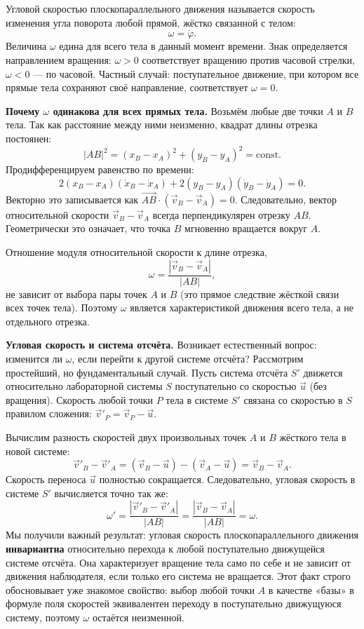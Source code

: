 \documentclass[../main.tex]{subfiles}
\begin{document}
\begin{definition}
Угловой скоростью плоскопараллельного движения называется скорость изменения
угла поворота любой прямой, жёстко связанной с телом:
\[
\omega = \dot\varphi.
\]
Величина $\omega$ едина для всего тела в данный момент времени.
Знак определяется направлением вращения: $\omega > 0$ соответствует
вращению против часовой стрелки, $\omega < 0$ --- по часовой.
Частный случай: поступательное движение, при котором все прямые тела
сохраняют своё направление, соответствует $\omega = 0$.
\end{definition}

\noindent\textbf{Почему $\omega$ одинакова для всех прямых тела.}
Возьмём любые две точки $A$ и $B$ тела. Так как расстояние между ними
неизменно, квадрат длины отрезка постоянен:
\[
|AB|^2 = (x_B - x_A)^2 + (y_B - y_A)^2 = \mathrm{const}.
\]
Продифференцируем равенство по времени:
\[
2(x_B - x_A)(\dot x_B - \dot x_A) + 2(y_B - y_A)(\dot y_B - \dot y_A) = 0.
\]
Векторно это записывается как $\overrightarrow{AB} \cdot (\vec{v}_B - \vec{v}_A) = 0$.
Следовательно, вектор относительной скорости $\vec{v}_B - \vec{v}_A$
всегда перпендикулярен отрезку $AB$. Геометрически это означает,
что точка $B$ мгновенно вращается вокруг $A$.

Отношение модуля относительной скорости к длине отрезка,
\[
\omega = \frac{|\vec{v}_B - \vec{v}_A|}{|AB|},
\]
не зависит от выбора пары точек $A$ и $B$ (это прямое следствие жёсткой
связи всех точек тела). Поэтому $\omega$ является характеристикой движения
всего тела, а не отдельного отрезка.

\noindent\textbf{Угловая скорость и система отсчёта.}
Возникает естественный вопрос: изменится ли $\omega$, если перейти к другой системе отсчёта? Рассмотрим простейший, но фундаментальный случай. Пусть система отсчёта $S'$ движется относительно лабораторной системы $S$ поступательно со скоростью $\vec{u}$ (без вращения). Скорость любой точки $P$ тела в системе $S'$ связана со скоростью в $S$ правилом сложения: $\vec{v}'_P = \vec{v}_P - \vec{u}$.

Вычислим разность скоростей двух произвольных точек $A$ и $B$ жёсткого тела в новой системе:
\[
\vec{v}'_B - \vec{v}'_A = (\vec{v}_B - \vec{u}) - (\vec{v}_A - \vec{u}) = \vec{v}_B - \vec{v}_A.
\]
Скорость переноса $\vec{u}$ полностью сокращается. Следовательно, угловая скорость в системе $S'$ вычисляется точно так же:
\[
\omega' = \frac{|\vec{v}'_B - \vec{v}'_A|}{|AB|} = \frac{|\vec{v}_B - \vec{v}_A|}{|AB|} = \omega.
\]
Мы получили важный результат: угловая скорость плоскопараллельного движения \textbf{инвариантна} относительно перехода к любой поступательно движущейся системе отсчёта. Она характеризует вращение тела само по себе и не зависит от движения наблюдателя, если только его система не вращается. Этот факт строго обосновывает уже знакомое свойство: выбор любой точки $A$ в качестве «базы» в формуле поля скоростей эквивалентен переходу в поступательно движущуюся систему, поэтому $\omega$ остаётся неизменной.
\end{document}
